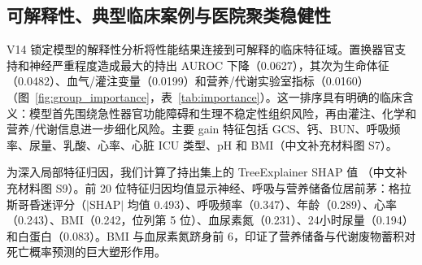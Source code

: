 \documentclass[11pt]{ctexart}
\begin{document}
\begin{table}[htbp]
\centering
\caption{eICU 持出集中 GERI-NutriRisk-ICU 的配对营养变量增量。AUROC 差值为正支持完整特征集，Brier 差值为负支持完整特征集；粗体表示最大的有利域更新对比。}
\label{tab:v14_nutrition}
\noindent{}
\end{table}

\subsection{可解释性、典型临床案例与医院聚类稳健性}
V14 锁定模型的解释性分析将性能结果连接到可解释的临床特征域。置换器官支持和神经严重程度造成最大的持出 AUROC 下降（0.0627），其次为生命体征（0.0482）、血气/灌注变量（0.0199）和营养/代谢实验室指标（0.0160）（图~\ref{fig:group_importance}，表~\ref{tab:importance}）。这一排序具有明确的临床含义：模型首先围绕急性器官功能障碍和生理不稳定性组织风险，再由灌注、化学和营养/代谢信息进一步细化风险。主要 gain 特征包括 GCS、钙、BUN、呼吸频率、尿量、乳酸、心率、心脏 ICU 类型、pH 和 BMI（中文补充材料图 S7）。

为深入局部特征归因，我们计算了持出集上的 TreeExplainer SHAP 值 \citep{Lundberg2020TreeSHAP}（中文补充材料图 S9）。前 20 位特征归因均值显示神经、呼吸与营养储备位居前茅：格拉斯哥昏迷评分（$|\mathrm{SHAP}|$ 均值 0.493）、呼吸频率（0.347）、年龄（0.289）、心率（0.243）、BMI（0.242，位列第 5 位）、血尿素氮（0.231）、24小时尿量（0.194）和白蛋白（0.083）。BMI 与血尿素氮跻身前 6，印证了营养储备与代谢废物蓄积对死亡概率预测的巨大塑形作用。
\end{document}
